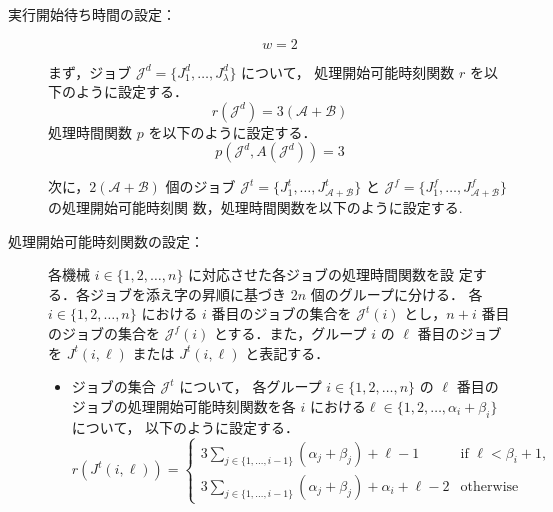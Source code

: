 \documentclass[12pt]{optlab-bachelor}
\begin{document}
\begin{description}
  \item[実行開始待ち時間の設定：] $$w = 2$$
  \item[] まず，ジョブ $\mathcal{J}^d = \{J^d_1,\ldots,J^d_{\lambda}\}$ について，
  処理開始可能時刻関数 $r$ を以下のように設定する．
  $$r(\mathcal{J}^d) = 3(\mathcal{A} + \mathcal{B})$$
  処理時間関数 $p$ を以下のように設定する．
  $$p(\mathcal{J}^d, A(\mathcal{J}^d)) = 3$$

  次に，$2(\mathcal{A} + \mathcal{B})$ 個のジョブ $\mathcal{J}^t =
  \{J^t_1,\ldots,J^t_{\mathcal{A} + \mathcal{B}}\}$ と $\mathcal{J}^f =
  \{J^f_1,\ldots,J^f_{\mathcal{A} + \mathcal{B}}\}$ の処理開始可能時刻関
  数，処理時間関数を以下のように設定する.
  \item[処理開始可能時刻関数の設定：] 各機械 $i \in \{1,2,\ldots,n\}$ に対応させた各ジョブの処理時間関数を設
  定する．各ジョブを添え字の昇順に基づき $2n$ 個のグループに分ける． 各 $i
  \in \{1,2,\ldots,n\}$ における $i$ 番目のジョブの集合を
  $\mathcal{J}^t(i)$ とし，$n + i$ 番目のジョブの集合を
  $\mathcal{J}^f(i)$ とする．また，グループ $i$ の $\ell$ 番目のジョブ
  を $J^t(i,\ell)$ または $J^t(i,\ell)$ と表記する．
  \begin{itemize}
    \item ジョブの集合 $\mathcal{J}^t$ について， 各グループ $i \in
    \{1,2,\ldots, n\}$ の $\ell$ 番目のジョブの処理開始可能時刻関数を各
    $i$ における$\ell \in \{1,2,\ldots, \alpha_i + \beta_i\}$ について，
    以下のように設定する．
    $$r(J^t(i,\ell)) =
    \left\{ \begin{array}{lll} 3 \displaystyle
    \sum_{j \in \{1,\ldots,i - 1\}}(\alpha_j + \beta_j) + \ell - 1 &
    \text{if } \ell < \beta_i + 1, \\ 3 \displaystyle \sum_{j \in \{1,\ldots,i - 1\}}(\alpha_j + \beta_j) + \alpha_i + \ell - 2 & \text{otherwise} \end{array} \right.$$


\end{itemize}
\end{description}
\end{document}
